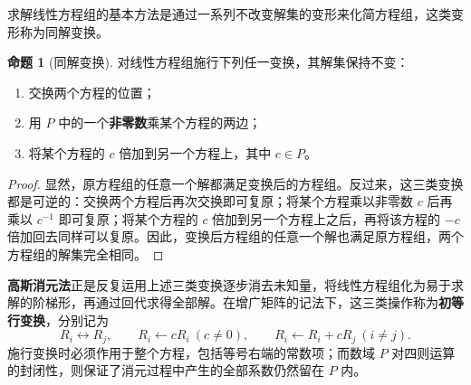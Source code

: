 \documentclass[UTF8, fontset=fandol, a4paper, 12pt]{ctexart}
\theoremstyle{definition}
\newtheorem{proposition}[definition]{命题}
\begin{document}
求解线性方程组的基本方法是通过一系列不改变解集的变形来化简方程组，这类变形称为同解变换。

\begin{proposition}[同解变换]
对线性方程组施行下列任一变换，其解集保持不变：
\begin{enumerate}
  \item 交换两个方程的位置；
  \item 用 $P$ 中的一个\textbf{非零数}乘某个方程的两边；
  \item 将某个方程的 $c$ 倍加到另一个方程上，其中 $c\in P$。
\end{enumerate}
\end{proposition}
\begin{proof}
显然，原方程组的任意一个解都满足变换后的方程组。反过来，这三类变换都是可逆的：交换两个方程后再次交换即可复原；将某个方程乘以非零数 $c$ 后再乘以 $c^{-1}$ 即可复原；将某个方程的 $c$ 倍加到另一个方程上之后，再将该方程的 $-c$ 倍加回去同样可以复原。因此，变换后方程组的任意一个解也满足原方程组，两个方程组的解集完全相同。
\end{proof}

\textbf{高斯消元法}正是反复运用上述三类变换逐步消去未知量，将线性方程组化为易于求解的阶梯形，再通过回代求得全部解。在增广矩阵的记法下，这三类操作称为\textbf{初等行变换}，分别记为
\[
  R_i\leftrightarrow R_j,\qquad
  R_i\leftarrow cR_i\ (c\ne0),\qquad
  R_i\leftarrow R_i+cR_j\ (i\ne j).
\]
施行变换时必须作用于整个方程，包括等号右端的常数项；而数域 $P$ 对四则运算的封闭性，则保证了消元过程中产生的全部系数仍然留在 $P$ 内。
\end{document}

